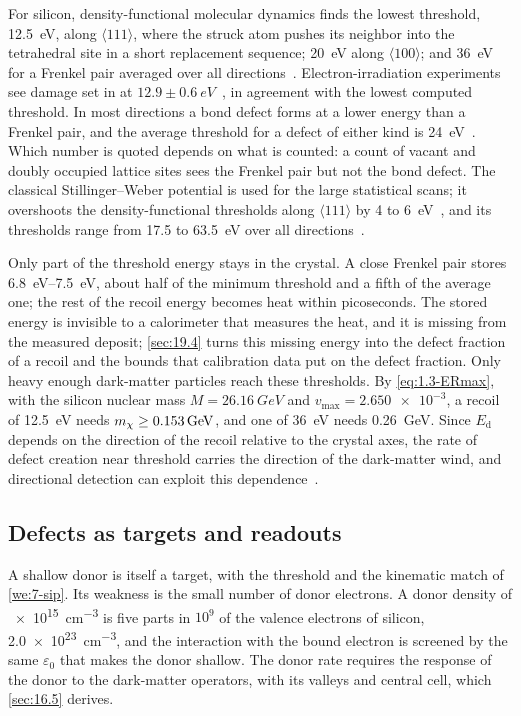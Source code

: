 For silicon, density-functional molecular dynamics finds the lowest threshold, \SI{12.5}{eV}, along $\langle111\rangle$, where the struck atom pushes its neighbor into the tetrahedral site in a short replacement sequence; \SI{20}{eV} along $\langle100\rangle$; and \SI{36}{eV} for a Frenkel pair averaged over all directions~\cite[Table~IV]{holmstrom2008threshold}. Electron-irradiation experiments see damage set in at $12.9 \pm \SI{0.6}{eV}$~\cite{loferski1958radiation}, in agreement with the lowest computed threshold. In most directions a bond defect forms at a lower energy than a Frenkel pair, and the average threshold for a defect of either kind is \SI{24}{eV}~\cite[Table~IV]{holmstrom2008threshold}. Which number is quoted depends on what is counted: a count of vacant and doubly occupied lattice sites sees the Frenkel pair but not the bond defect. The classical Stillinger--Weber potential is used for the large statistical scans; it overshoots the density-functional thresholds along $\langle111\rangle$ by 4 to \SI{6}{eV}~\cite[Sect.~IV]{holmstrom2008threshold}, and its thresholds range from 17.5 to \SI{63.5}{eV} over all directions~\cite{kadribasic2018directional}.

Only part of the threshold energy stays in the crystal. A close Frenkel pair stores \SIrange{6.8}{7.5}{eV}, about half of the minimum threshold and a fifth of the average one; the rest of the recoil energy becomes heat within picoseconds. The stored energy is invisible to a calorimeter that measures the heat, and it is missing from the measured deposit; \cref{sec:19.4} turns this missing energy into the defect fraction of a recoil and the bounds that calibration data put on the defect fraction. Only heavy enough dark-matter particles reach these thresholds. By \cref{eq:1.3-ERmax}, with the silicon nuclear mass $M = \SI{26.16}{GeV}$ and $v_{\mathrm{max}} = \num{2.650e-3}$, a recoil of \SI{12.5}{eV} needs $m_{\chi} \ge \SI{0.153}{GeV}$, and one of \SI{36}{eV} needs \SI{0.26}{GeV}. Since $E_{\mathrm{d}}$ depends on the direction of the recoil relative to the crystal axes, the rate of defect creation near threshold carries the direction of the dark-matter wind, and directional detection can exploit this dependence~\cite{kadribasic2018directional}.

\subsection{Defects as targets and readouts}

A shallow donor is itself a target, with the threshold and the kinematic match of \cref{we:7-sip}. Its weakness is the small number of donor electrons. A donor density of \SI{e15}{cm^{-3}} is five parts in $10^{9}$ of the valence electrons of silicon, \SI{2.0e23}{cm^{-3}}, and the interaction with the bound electron is screened by the same $\varepsilon_0$ that makes the donor shallow. The donor rate requires the response of the donor to the dark-matter operators, with its valleys and central cell, which \cref{sec:16.5} derives.

